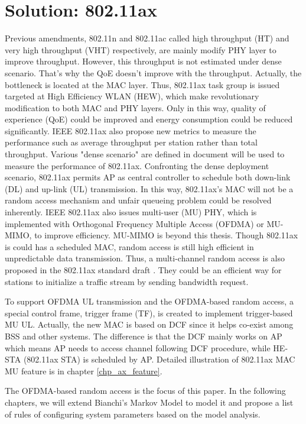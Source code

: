 \section{Solution: 802.11ax}
Previous amendments, 802.11n and 802.11ac called high throughput (HT) and very high throughput (VHT) respectively, are mainly modify PHY layer to improve throughput\cite{perahia2013next}. 
However, this throughput is not estimated under dense scenario. 
That's why the QoE doesn't improve with the throughput.  
Actually, the bottleneck is located at the MAC layer.
Thus, 802.11ax task group is issued targeted at High Efficiency WLAN (HEW)\cite{802.11ax_par}, which make revolutionary modification to both MAC and PHY layers.
Only in this way, quality of experience (QoE) could be improved and energy consumption could be reduced significantly.
IEEE 802.11ax also propose new metrics to measure the performance such as average throughput per station rather than total throughput.
Various "dense scenario" are defined in document \cite{802.11ax_simu} will be used to measure the performance of 802.11ax.
Confronting the dense deployment scenario, 802.11ax permits AP as central controller to schedule both down-link (DL) and up-link (UL) transmission. 
In this way, 802.11ax's MAC will not be a random access mechanism and unfair queueing problem could be resolved inherently.
IEEE 802.11ax also issues multi-user (MU) PHY, which is implemented with Orthogonal Frequency Multiple Access (OFDMA) or MU-MIMO, to improve efficiency.
MU-MIMO is beyond this thesis. 
Though 802.11ax is could has a scheduled MAC, random access is still high efficient in unpredictable data transmission.
Thus, a multi-channel random access is also proposed in the 802.11ax standard draft \cite{draft_ax}. 
They could be an efficient way for stations to initialize a traffic stream by sending bandwidth request.

To support OFDMA UL transmission and the OFDMA-based random access, a special control frame, trigger frame (TF), is created to implement trigger-based MU UL\cite{draft_ax}. 
Actually, the new MAC is based on DCF since it helps co-exist among BSS and other systems. The difference is that the DCF mainly works on AP which means AP needs to access channel following DCF procedure, while HE-STA (802.11ax STA) is scheduled by AP. 
Detailed illustration of 802.11ax MAC MU feature is in chapter \ref{chp_ax_feature}.

The OFDMA-based random access is the focus of this paper. In the following chapters, we will extend Bianchi's Markov Model to model it and propose a list of rules of configuring system parameters based on the model analysis.

